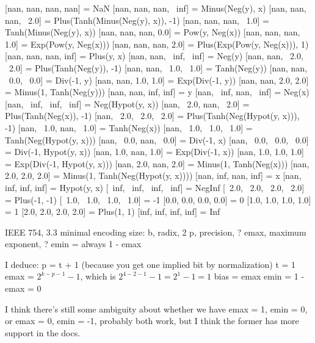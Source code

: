 \documentclass[twocolumn]{article}
\begin{document}
[nan, nan, nan, nan] = NaN
[nan, nan, nan, ~inf] = Minus(Neg(y), x)
[nan, nan, nan, ~2.0] = Plus(Tanh(Minus(Neg(y), x)), -1)
[nan, nan, nan, ~1.0] = Tanh(Minus(Neg(y), x))
[nan, nan, nan, 0.0] = Pow(y, Neg(x))
[nan, nan, nan, 1.0] = Exp(Pow(y, Neg(x)))
[nan, nan, nan, 2.0] = Plus(Exp(Pow(y, Neg(x))), 1)
[nan, nan, nan, inf] = Plus(y, x)
[nan, nan, ~inf, ~inf] = Neg(y)
[nan, nan, ~2.0, ~2.0] = Plus(Tanh(Neg(y)), -1)
[nan, nan, ~1.0, ~1.0] = Tanh(Neg(y))
[nan, nan, ~0.0, ~0.0] = Div(-1, y)
[nan, nan, 1.0, 1.0] = Exp(Div(-1, y))
[nan, nan, 2.0, 2.0] = Minus(1, Tanh(Neg(y)))
[nan, nan, inf, inf] = y
[nan, ~inf, nan, ~inf] = Neg(x)
[nan, ~inf, ~inf, ~inf] = Neg(Hypot(y, x))
[nan, ~2.0, nan, ~2.0] = Plus(Tanh(Neg(x)), -1)
[nan, ~2.0, ~2.0, ~2.0] = Plus(Tanh(Neg(Hypot(y, x))), -1)
[nan, ~1.0, nan, ~1.0] = Tanh(Neg(x))
[nan, ~1.0, ~1.0, ~1.0] = Tanh(Neg(Hypot(y, x)))
[nan, ~0.0, nan, ~0.0] = Div(-1, x)
[nan, ~0.0, ~0.0, ~0.0] = Div(-1, Hypot(y, x))
[nan, 1.0, nan, 1.0] = Exp(Div(-1, x))
[nan, 1.0, 1.0, 1.0] = Exp(Div(-1, Hypot(y, x)))
[nan, 2.0, nan, 2.0] = Minus(1, Tanh(Neg(x)))
[nan, 2.0, 2.0, 2.0] = Minus(1, Tanh(Neg(Hypot(y, x))))
[nan, inf, nan, inf] = x
[nan, inf, inf, inf] = Hypot(y, x)
[~inf, ~inf, ~inf, ~inf] = NegInf
[~2.0, ~2.0, ~2.0, ~2.0] = Plus(-1, -1)
[~1.0, ~1.0, ~1.0, ~1.0] = -1
[0.0, 0.0, 0.0, 0.0] = 0
[1.0, 1.0, 1.0, 1.0] = 1
[2.0, 2.0, 2.0, 2.0] = Plus(1, 1)
[inf, inf, inf, inf] = Inf


IEEE 754, 3.3
minimal encoding size:
b, radix, 2
p, precision, ?
emax, maximum exponent, ?
emin = always 1 - emax


I deduce:
p = t + 1
    (because you get one implied bit by normalization)
t = 1
emax = $2^{k-p-1} - 1$, which is $2^{4-2-1}-1 = 2^1-1 = 1$
bias = emax
emin = 1 - emax = 0

I think there's still some ambiguity about whether we have
emax = 1, emin = 0,
or
emax = 0, emin = -1,
probably both work, but I think the former has more support
in the docs.
\end{document}
